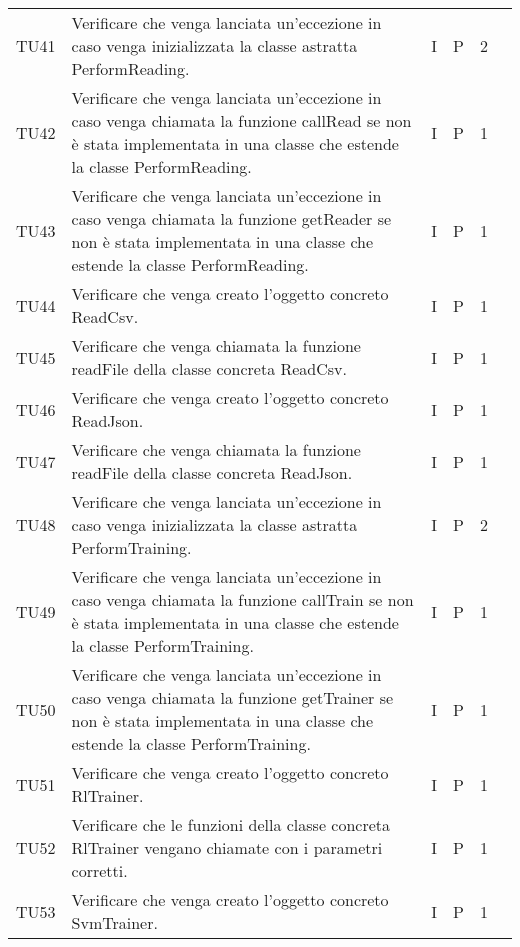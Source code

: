 \begin{longtable} {
		>{}p{12mm}
		>{}p{79.5mm}
		>{}p{9mm}
		>{}p{8mm}
		>{}p{14mm}
		>{}p{0mm}}
	TU41		& Verificare che venga lanciata un'eccezione in caso venga inizializzata la classe astratta PerformReading. & I & P & 2 & \TBstrut \\ [2mm]
	TU42		& Verificare che venga lanciata un'eccezione in caso venga chiamata la funzione callRead se non è stata implementata in una classe che estende la classe PerformReading. & I & P & 1 & \TBstrut \\ [2mm]
	TU43		& Verificare che venga lanciata un'eccezione in caso venga chiamata la funzione getReader se non è stata implementata in una classe che estende la classe PerformReading. & I & P & 1 & \TBstrut \\ [2mm]
	TU44		& Verificare che venga creato l'oggetto concreto ReadCsv. & I & P & 1 & \TBstrut \\ [2mm]
	TU45		& Verificare che venga chiamata la funzione readFile della classe concreta ReadCsv. & I & P & 1 & \TBstrut \\ [2mm]
	TU46		& Verificare che venga creato l'oggetto concreto ReadJson. & I & P & 1 & \TBstrut \\ [2mm]
	TU47		& Verificare che venga chiamata la funzione readFile della classe concreta ReadJson. & I & P & 1 & \TBstrut \\ [2mm]
	TU48		& Verificare che venga lanciata un'eccezione in caso venga inizializzata la classe astratta PerformTraining. & I & P & 2 & \TBstrut \\ [2mm]
	TU49		& Verificare che venga lanciata un'eccezione in caso venga chiamata la funzione callTrain se non è stata implementata in una classe che estende la classe PerformTraining. & I & P & 1 & \TBstrut \\ [2mm]
	TU50		& Verificare che venga lanciata un'eccezione in caso venga chiamata la funzione getTrainer se non è stata implementata in una classe che estende la classe PerformTraining. & I & P & 1 & \TBstrut \\ [2mm]
	TU51		& Verificare che venga creato l'oggetto concreto RlTrainer. & I & P & 1 & \TBstrut \\ [2mm]
	TU52		& Verificare che le funzioni della classe concreta RlTrainer vengano chiamate con i parametri corretti. & I & P & 1 & \TBstrut \\ [2mm]
	TU53		& Verificare che venga creato l'oggetto concreto SvmTrainer. & I & P & 1 & \TBstrut \\ [2mm]

\end{longtable}
